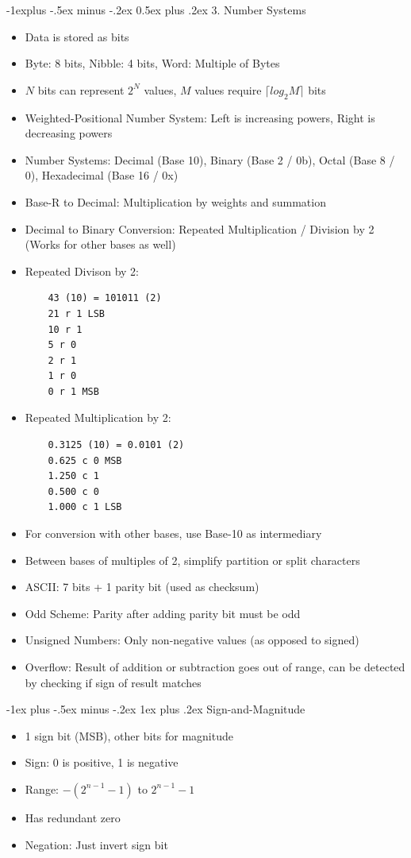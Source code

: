 \documentclass[10pt, portrait]{article}
\makeatletter
\renewcommand{\section}{\@startsection{section}{1}{0mm}%
                                {-1ex plus -.5ex minus -.2ex}%
                                {0.5ex plus .2ex}%
                                {\normalfont\large\bfseries}}
\renewcommand{\section}{\@startsection{section}{2}{0mm}%
                                {-1explus -.5ex minus -.2ex}%
                                {0.5ex plus .2ex}%
                                {\normalfont\normalsize\bfseries}}
\renewcommand{\subsection}{\@startsection{subsection}{3}{0mm}%
                                {-1ex plus -.5ex minus -.2ex}%
                                {1ex plus .2ex}%
                                {\normalfont\small\bfseries}}%
\makeatother
\begin{document}
\begin{multicols*}{2}
\section{3. Number Systems}
\begin{itemize}
    \item Data is stored as bits
    \item Byte: 8 bits, Nibble: 4 bits, Word: Multiple of Bytes
    \item $N$ bits can represent $2^N$ values, $M$ values require $\lceil log_2M \rceil$ bits
    \item Weighted-Positional Number System: Left is increasing powers, Right is decreasing powers
    \item Number Systems: Decimal (Base 10), Binary (Base 2 / 0b), Octal (Base 8 / 0), Hexadecimal (Base 16 / 0x)
    \item Base-R to Decimal: Multiplication by weights and summation
    \item Decimal to Binary Conversion: Repeated Multiplication / Division by 2 (Works for other bases as well)
    \item Repeated Divison by 2:
    \begin{verbatim}
    43 (10) = 101011 (2)
    21 r 1 LSB
    10 r 1
    5 r 0
    2 r 1
    1 r 0
    0 r 1 MSB
    \end{verbatim}
    \item Repeated Multiplication by 2:
    \begin{verbatim}
    0.3125 (10) = 0.0101 (2)
    0.625 c 0 MSB
    1.250 c 1
    0.500 c 0
    1.000 c 1 LSB
    \end{verbatim}
    \item For conversion with other bases, use Base-10 as intermediary
    \item Between bases of multiples of 2, simplify partition or split characters
    \item ASCII: 7 bits + 1 parity bit (used as checksum)
    \item Odd Scheme: Parity after adding parity bit must be odd
    \item Unsigned Numbers: Only non-negative values (as opposed to signed)
    \item Overflow: Result of addition or subtraction goes out of range, can be detected by checking if sign of result matches
\end{itemize}

\subsection{Sign-and-Magnitude}
\begin{itemize}
    \item 1 sign bit (MSB), other bits for magnitude
    \item Sign: 0 is positive, 1 is negative
    \item Range: $-(2^{n-1}-1)$ to $2^{n-1}-1$
    \item Has redundant zero
    \item Negation: Just invert sign bit
\end{itemize}


\end{multicols*}
\end{document}

